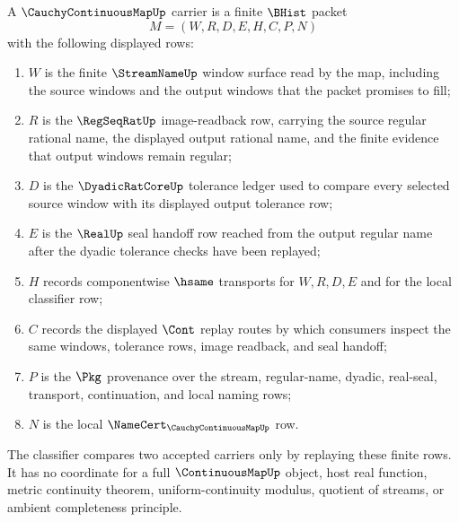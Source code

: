 \begin{definition}
\label{def:cauchy-continuous-map-carrier}
A $\CauchyContinuousMapUp$ carrier is a finite $\BHist$ packet
$$
M=(W,R,D,E,H,C,P,N)
$$
with the following displayed rows:
\begin{enumerate}
\item $W$ is the finite $\StreamNameUp$ window surface read by the map, including the source windows and the output windows that the packet promises to fill;
\item $R$ is the $\RegSeqRatUp$ image-readback row, carrying the source regular rational name, the displayed output rational name, and the finite evidence that output windows remain regular;
\item $D$ is the $\DyadicRatCoreUp$ tolerance ledger used to compare every selected source window with its displayed output tolerance row;
\item $E$ is the $\RealUp$ seal handoff row reached from the output regular name after the dyadic tolerance checks have been replayed;
\item $H$ records componentwise $\hsame$ transports for $W,R,D,E$ and for the local classifier row;
\item $C$ records the displayed $\Cont$ replay routes by which consumers inspect the same windows, tolerance rows, image readback, and seal handoff;
\item $P$ is the $\Pkg$ provenance over the stream, regular-name, dyadic, real-seal, transport, continuation, and local naming rows;
\item $N$ is the local $\NameCert_{\CauchyContinuousMapUp}$ row.
\end{enumerate}
The classifier compares two accepted carriers only by replaying these finite rows. It has no coordinate for a full $\ContinuousMapUp$ object, host real function, metric continuity theorem, uniform-continuity modulus, quotient of streams, or ambient completeness principle.
\end{definition}


